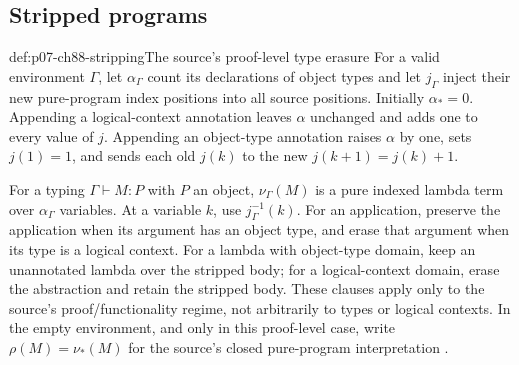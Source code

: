 \subsection{Stripped programs}

\begin{hbdefinition}{def:p07-ch88-stripping}{The source's proof-level type erasure}
For a valid environment \(\Gamma\), let \(\alpha_\Gamma\) count its
declarations of object types and let \(j_\Gamma\) inject their new
pure-program index positions into all source positions. Initially
\(\alpha_\ast=0\). Appending a logical-context annotation leaves
\(\alpha\) unchanged and adds one to every value of \(j\).
Appending an object-type annotation raises \(\alpha\) by one,
sets \(j(1)=1\), and sends each old \(j(k)\) to the new
\(j(k+1)=j(k)+1\).

For a typing \(\Gamma\vdash M:P\) with \(P\) an object,
\(\nu_\Gamma(M)\) is a pure indexed lambda term over
\(\alpha_\Gamma\) variables. At a variable \(k\), use
\(j_\Gamma^{-1}(k)\). For an application, preserve the application
when its argument has an object type, and erase that argument when
its type is a logical context. For a lambda with object-type domain,
keep an unannotated lambda over the stripped body; for a logical-context
domain, erase the abstraction and retain the stripped body. These
clauses apply only to the source's proof/functionality regime, not
arbitrarily to types or logical contexts. In the empty environment,
and only in this proof-level case, write
\(\rho(M)=\nu_\ast(M)\) for the source's closed pure-program
interpretation
\cite[\S4, pp.~105--107]{CoquandHuet1988}.
\end{hbdefinition}



